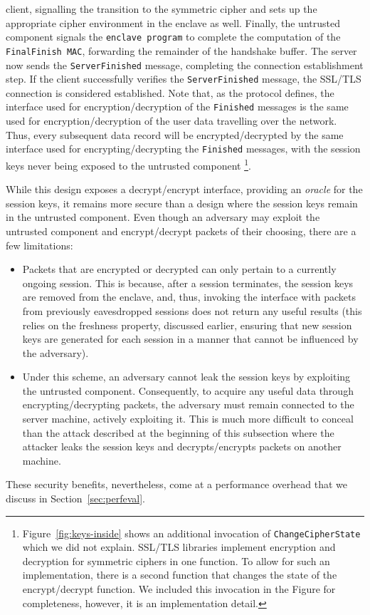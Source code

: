 \documentclass[../../main.tex]{subfiles}
\begin{document}
client, signalling the transition to the symmetric cipher and sets up
the appropriate cipher environment in the enclave as well. Finally,
the untrusted component signals the \texttt{enclave program} to
complete the computation of the \texttt{FinalFinish MAC}, forwarding
the remainder of the handshake buffer. The server now sends the
\texttt{ServerFinished} message, completing the connection
establishment step. If the client successfully verifies the
\texttt{ServerFinished} message, the SSL/TLS connection is considered
established. Note that, as the protocol defines, the interface used
for encryption/decryption of the \texttt{Finished} messages is the
same used for encryption/decryption of the user data travelling over
the network. Thus, every subsequent data record will be
encrypted/decrypted by the same interface used for
encrypting/decrypting the \texttt{Finished} messages, with the session
keys never being exposed to the untrusted component
\footnote{Figure~\ref{fig:keys-inside} shows an additional invocation
  of \texttt{Change\-Cipher\-State} which we did not explain. SSL/TLS
  libraries implement encryption and decryption for symmetric ciphers
  in one function. To allow for such an implementation, there is a
  second function that changes the state of the encrypt/decrypt
  function. We included this invocation in the Figure for
  completeness, however, it is an implementation detail.}.

While this design exposes a decrypt/encrypt interface, providing an
\textit{oracle} for the session keys, it remains more secure than a
design where the session keys remain in the untrusted component. Even
though an adversary may exploit the untrusted component and
encrypt/decrypt packets of their choosing, there are a few
limitations:
\begin{itemize}
  \item Packets that are encrypted or decrypted can only pertain to
    a currently ongoing session. This is because, after a session
    terminates, the session keys are removed from the enclave, and, thus,
    invoking the interface with packets from previously eavesdropped
    sessions does not return any useful results (this relies on the
    freshness property, discussed earlier, ensuring that new session keys
    are generated for each session in a manner that cannot be influenced
    by the adversary).
  \item Under this scheme, an adversary cannot leak the session keys
    by exploiting the untrusted component. Consequently, to acquire
    any useful data through encrypting/decrypting packets, the adversary
    must remain connected to the server machine, actively exploiting it.
    This is much more difficult to conceal than the attack described
    at the beginning of this subsection where the attacker leaks the session
    keys and decrypts/encrypts packets on another machine.
\end{itemize}
These security benefits, nevertheless, come at a performance overhead
that we discuss in Section~\ref{sec:perfeval}.
\end{document}

